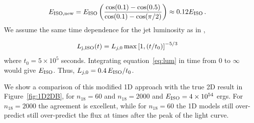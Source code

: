 \documentclass[usenatbib,fleqn]{mnras}
\begin{document}
\begin{equation}\label{eq:Eiso}
 E_{\rm ISO, new} = E_{\rm ISO} \left(\frac{\cos(0.1) - \cos(0.5)}{\cos(0.1) - \cos(\pi/2)}\right)\approx 0.12 E_{\rm ISO}\, .
\end{equation}
%
We assume the same time dependence for the jet luminosity as in
\citet{Mimica+2015},

\begin{equation}\label{eq:lum}
L_{\rm j, ISO}(t) = L_{j,0}\max\left[1, (t/t_0)\right]^{-5/3}
\end{equation}
%
where $t_0 = 5\times 10^5$ seconds. Integrating equation~\ref{eq:lum}
in time from $0$ to $\infty$ would give $E_{\rm ISO}$. Thus,
$L_{j,0}=0.4\, E_{\rm ISO}/t_0$. 

We show a comparison of this modified 1D approach with the true 2D
result in Figure~\ref{fig:1D2DB}, for $n_{18}=60$ and $n_{18}=2000$
and $E_{\rm ISO}=4 \times 10^{54}$ ergs. For $n_{18}=2000$ the
agreement is excellent, while for $n_{18}=60$ the 1D models still
over-predict still over-predict the flux at times after the peak of
the light curve.

\end{document}
